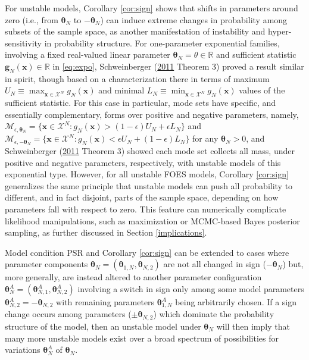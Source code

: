 \documentclass[]{article}
\theoremstyle{definition}
\let\BeginKnitrBlock\begin \let\EndKnitrBlock\end
\begin{document}
For unstable models, Corollary \ref{cor:sign} shows that shifts in
parameters around zero (i.e., from \(\boldsymbol \theta_N\) to
\(-\boldsymbol \theta_N\)) can induce extreme changes in probability
among subsets of the sample space, as another manifestation of
instability and hyper-sensitivity in probability structure. For
one-parameter exponential families, involving a fixed real-valued linear
parameter \(\boldsymbol \theta_N = \theta \in \mathbb{R}\) and
sufficient statistic \(\boldsymbol g_N(\boldsymbol x)\in \mathbb{R}\) in
\eqref{eq:expo}, Schweinberger
(\protect\hyperlink{ref-schweinberger2011instability}{2011} Theorem 3)
proved a result similar in spirit, though based on a characterization
there in terms of maximum
\(U_N \equiv \max_{\boldsymbol x\in\mathcal{X}^N}g_N(\boldsymbol x)\)
and minimal
\(L_N \equiv \min_{\boldsymbol x\in\mathcal{X}^N}g_N(\boldsymbol x)\)
values of the sufficient statistic. For this case in particular, mode
sets have specific, and essentially complementary, forms over positive
and negative parameters, namely,
\(\mathcal{M}_{\epsilon, \boldsymbol \theta_N} = \{\boldsymbol x \in\mathcal{X}^N: g_N(\boldsymbol x) > (1-\epsilon) U_N + \epsilon L_N \}\)
and
\(\mathcal{M}_{\epsilon, -\boldsymbol \theta_N} = \{\boldsymbol x \in\mathcal{X}^N: g_N(\boldsymbol x) < \epsilon U_N + (1-\epsilon) L_N \}\)
for any \(\boldsymbol \theta_N>0\), and Schweinberger
(\protect\hyperlink{ref-schweinberger2011instability}{2011} Theorem 3)
showed each mode set collects all mass, under positive and negative
parameters, respectively, with unstable models of this exponential type.
However, for all unstable FOES models, Corollary \ref{cor:sign}
generalizes the same principle that unstable models can push all
probability to different, and in fact disjoint, parts of the sample
space, depending on how parameters fall with respect to zero. This
feature can numerically complicate likelihood manipulations, such as
maximization or MCMC-based Bayes posterior sampling, as further
discussed in Section \ref{implications}.

\BeginKnitrBlock{remark}
\iffalse <span class="remark"><em>Remark. \fi{} Model condition PSR and
Corollary \ref{cor:sign} can be extended to cases where parameter
components
\(\boldsymbol \theta_N =(\boldsymbol \theta_{1,N}, \boldsymbol \theta_{N,2})\)
are not all changed in sign (\(-\boldsymbol \theta_N\)) but, more
generally, are instead altered to another parameter configuration
\(\boldsymbol \theta_{N}^A = (\boldsymbol \theta_{N,1}^A, \boldsymbol \theta_{N,2}^A)\)
involving a switch in sign only among some model parameters
\(\boldsymbol \theta_{N,2}^A = -\boldsymbol \theta_{N,2}\) with
remaining parameters \(\boldsymbol \theta_{1,N}^A\) being arbitrarily
chosen. If a sign change occurs among parameters
(\(\pm \boldsymbol \theta_{N,2}\)) which dominate the probability
structure of the model, then an unstable model under
\(\boldsymbol \theta_N\) will then imply that many more unstable models
exist over a broad spectrum of possibilities for variations
\(\boldsymbol \theta_{N}^A\) of \(\boldsymbol \theta_N\).
\EndKnitrBlock{remark}
\end{document}
